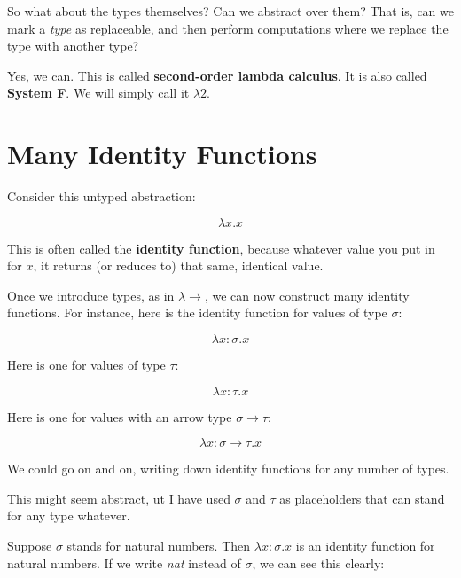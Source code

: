 \documentclass{book}
\numberwithin{equation}{chapter}
\newcommand{\vocab}{\textbf}
\begin{document}
So what about the types themselves? Can we abstract over them? That is, can we mark a \textit{type} as replaceable, and then perform computations where we replace the type with another type?

Yes, we can. This is called \vocab{second-order lambda calculus}. It is also called \vocab{System F}. We will simply call it $\lambda 2$.


\section{Many Identity Functions}

Consider this untyped abstraction:

\begin{equation}
\lambda x.x
\end{equation}

\noindent
This is often called the \vocab{identity function}, because whatever value you put in for $x$, it returns (or reduces to) that same, identical value.

Once we introduce types, as in $\lambda\rightarrow$, we can now construct many identity functions. For instance, here is the identity function for values of type $\sigma$:

\begin{equation}
\lambda x : \sigma.x
\end{equation}

\noindent
Here is one for values of type $\tau$:

\begin{equation}
\lambda x : \tau.x
\end{equation}

\noindent
Here is one for values with an arrow type $\sigma \rightarrow \tau$:

\begin{equation}
\lambda x : \sigma \rightarrow \tau.x
\end{equation}

\noindent
We could go on and on, writing down identity functions for any number of types.

This might seem abstract, ut I have used $\sigma$ and $\tau$ as placeholders that can stand for any type whatever. 

Suppose $\sigma$ stands for natural numbers. Then $\lambda x: \sigma.x$ is an identity function for natural numbers. If we write \textit{nat} instead of $\sigma$, we can see this clearly:
\end{document}
